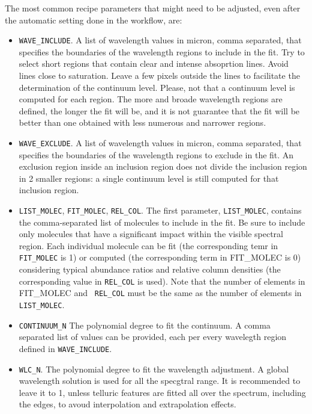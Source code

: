 The most common recipe parameters that might need to be adjusted, even
after the automatic setting done in the workflow, are:

\begin{itemize}

\item {\tt WAVE\_INCLUDE}. A list of wavelength values in micron,
  comma separated, that specifies the boundaries of the wavelength
  regions to include in the fit. Try to select short regions that contain
  clear and intense absoprtion lines. Avoid lines close to
  saturation. Leave a few pixels outside the lines to facilitate the
  determination of the continuum level.  Please, not that a continuum
  level is computed for each region. The more and broade wavelength
  regions are defined, the longer the fit will be, and it is not
  guarantee that the fit will be better than one obtained with less
  numerous and narrower regions.

\item {\tt WAVE\_EXCLUDE}. A list of wavelength values in micron,
  comma separated, that specifies the boundaries of the wavelength
  regions to exclude in the fit. An exclusion region inside an
  inclusion region does not divide the inclusion region in 2 smaller
  regions: a single continuum level is still computed for that
  inclusion region.

\item {\tt LIST\_MOLEC}, {\tt FIT\_MOLEC}, {\tt REL\_COL}. The first
  parameter, {\tt LIST\_MOLEC}, contains the comma-separated list of
  molecules to include in the fit. Be sure to include only molecules
  that have a significant impact within the visible spectral
  region. Each individual molecule can be fit (the corresponding temr
  in {\tt FIT\_MOLEC} is 1) or computed (the corresponding term in
  FIT\_MOLEC is 0) considering typical abundance ratios and relative
  column densities (the corresponding value in {\tt REL\_COL} is
  used). Note that the number of elements in FIT\_MOLEC and {\tt
    REL\_COL} must be the same as the number of elements in {\tt
    LIST\_MOLEC}.
  
\item {\tt CONTINUUM\_N} The polynomial degree to fit the continuum. A
  comma separated list of values can be provided, each per every
  wavelegth region defined in {\tt WAVE\_INCLUDE}.

\item {\tt WLC\_N}. The polynomial degree to fit the wavelength
  adjustment. A global wavelength solution is used for all the
  specgtral range. It is recommended to leave it to 1, unless telluric
  features are fitted all over the spectrum, including the edges, to
  avoud interpolation and extrapolation effects.
  

\end{itemize}
